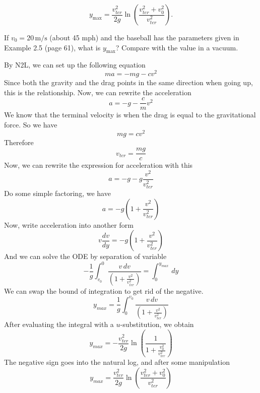 \documentclass[12pt]{article}
\newcommand{\paren}[1]{\left( #1 \right)}
\begin{document}
\[
y_{\text{max}} = \frac{v_{ter}^2}{2g} \ln\left(\frac{v_{ter}^2 + v_0^2}{v_{ter}^2}\right).
\]

If $v_0 = 20 \, \text{m/s}$ (about 45 mph) and the baseball has the parameters given in Example 2.5 (page 61), what is $y_{\text{max}}$? Compare with the value in a vacuum.

By N2L, we can set up the following equation
\[
ma = -mg-cv^2
\]
Since both the gravity and the drag points in the same direction when going up, this is the relationship. Now, we can rewrite the acceleration
\[
a = -g - \frac{c}{m}v^2
\]
We know that the terminal velocity is when the drag is equal to the gravitational force. So we have
\[
mg = cv^2
\]
Therefore
\[
v_{ter} = \frac{mg}{c}
\]
Now, we can rewrite the expression for acceleration with this
\[
a = -g - g\frac{v^2}{v_{ter}^2}
\]
Do some simple factoring, we have
\[
a = -g\paren{1+ \frac{v^2}{v_{ter}^2}}
\]
Now, write acceleration into another form
\[
v\frac{dv}{dy} =  -g\paren{1+ \frac{v^2}{v_{ter}^2}}
\]
And we can solve the ODE by separation of variable
\[
-\frac{1}{g}\int_{v_0}^{0}\frac{v\,dv}{\paren{1+ \frac{v^2}{v_{ter}^2}}} = \int_{0}^{y_{max}}\,dy
\]
We can swap the bound of integration to get rid of the negative. 
\[
y_{max} = \frac{1}{g}\int_{0}^{v_0}\frac{v\,dv}{\paren{1+ \frac{v^2}{v_{ter}^2}}}
\]
After evaluating the integral with a $u$-substitution, we obtain
\[
y_{max} = -\frac{v_{ter}^2}{2g}\ln\paren{\frac{1}{1+\frac{v_0^2}{v_{ter}^2}}}
\]
The negative sign goes into the natural log, and after some manipulation
\[
y_{max} = \frac{v_{ter}^2}{2g}\ln\paren{\frac{v^2_{ter}+v_0^2}{v_{ter}^2}}
\]
\end{document}
